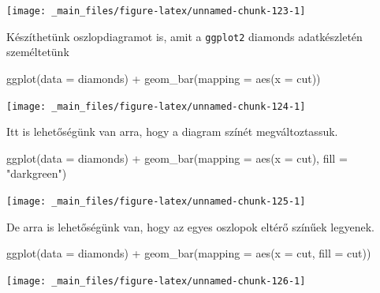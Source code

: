 \documentclass[
]{book}
\newenvironment{Shaded}{\begin{snugshade}}{\end{snugshade}}
\newcommand{\AttributeTok}[1]{\textcolor[rgb]{0.77,0.63,0.00}{#1}}
\newcommand{\FunctionTok}[1]{\textcolor[rgb]{0.00,0.00,0.00}{#1}}
\newcommand{\NormalTok}[1]{#1}
\newcommand{\SpecialCharTok}[1]{\textcolor[rgb]{0.00,0.00,0.00}{#1}}
\newcommand{\StringTok}[1]{\textcolor[rgb]{0.31,0.60,0.02}{#1}}
\begin{document}
\begin{center}\texttt{[image: \_main\_files/figure-latex/unnamed-chunk-123-1]} \end{center}

Készíthetünk oszlopdiagramot is, amit a \texttt{ggplot2} diamonds
adatkészletén személtetünk

\begin{Shaded}
\begin{Highlighting}[]
\FunctionTok{ggplot}\NormalTok{(}\AttributeTok{data =}\NormalTok{ diamonds) }\SpecialCharTok{+}
  \FunctionTok{geom\_bar}\NormalTok{(}\AttributeTok{mapping =} \FunctionTok{aes}\NormalTok{(}\AttributeTok{x =}\NormalTok{ cut))}
\end{Highlighting}
\end{Shaded}

\begin{center}\texttt{[image: \_main\_files/figure-latex/unnamed-chunk-124-1]} \end{center}

Itt is lehetőségünk van arra, hogy a diagram színét megváltoztassuk.

\begin{Shaded}
\begin{Highlighting}[]
\FunctionTok{ggplot}\NormalTok{(}\AttributeTok{data =}\NormalTok{ diamonds) }\SpecialCharTok{+}
  \FunctionTok{geom\_bar}\NormalTok{(}\AttributeTok{mapping =} \FunctionTok{aes}\NormalTok{(}\AttributeTok{x =}\NormalTok{ cut), }\AttributeTok{fill =} \StringTok{"darkgreen"}\NormalTok{)}
\end{Highlighting}
\end{Shaded}

\begin{center}\texttt{[image: \_main\_files/figure-latex/unnamed-chunk-125-1]} \end{center}

De arra is lehetőségünk van, hogy az egyes oszlopok eltérő színűek
legyenek.

\begin{Shaded}
\begin{Highlighting}[]
\FunctionTok{ggplot}\NormalTok{(}\AttributeTok{data =}\NormalTok{ diamonds) }\SpecialCharTok{+}
  \FunctionTok{geom\_bar}\NormalTok{(}\AttributeTok{mapping =} \FunctionTok{aes}\NormalTok{(}\AttributeTok{x =}\NormalTok{ cut, }\AttributeTok{fill =}\NormalTok{ cut))}
\end{Highlighting}
\end{Shaded}

\begin{center}\texttt{[image: \_main\_files/figure-latex/unnamed-chunk-126-1]} \end{center}
\end{document}
